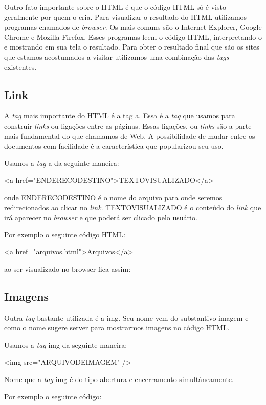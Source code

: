 Outro fato importante sobre o HTML é que o código HTML só é visto geralmente por quem o cria. Para visualizar o resultado do HTML utilizamos programas chamados de \textit{browser}. Os mais comuns são o Internet Explorer, Google Chrome e Mozilla Firefox. Esses programas leem o código HTML, interpretando-o e mostrando em sua tela o resultado. Para obter o resultado final que são os sites que estamos acostumados a visitar utilizamos uma combinação das \textit{tags} existentes.

\subsection{Link}

A \textit{tag} mais importante do HTML é a tag a. Essa é a \textit{tag} que usamos para construir \textit{links} ou ligações entre as páginas. Essas ligações, ou \textit{links} são a parte mais fundamental do que chamamos de Web. A possibilidade de mudar entre os documentos com facilidade é a característica que popularizou seu uso.

Usamos a \textit{tag} a da seguinte maneira:

<a href="ENDERECODESTINO">TEXTOVISUALIZADO</a>

onde ENDERECODESTINO é o nome do arquivo para onde seremos redirecionados ao clicar no \textit{link}. TEXTOVISUALIZADO é o conteúdo do \textit{link} que irá aparecer no \textit{browser} e que poderá ser clicado pelo usuário.

Por exemplo o seguinte código HTML:

<a href="arquivos.html">Arquivos</a>

ao ser visualizado no browser fica assim:


\subsection{Imagens}

Outra \textit{tag} bastante utilizada é a img. Seu nome vem do substantivo imagem e como o nome sugere server para mostrarmos imagens no código HTML.

Usamos a \textit{tag} img da seguinte maneira:

<img src="ARQUIVODEIMAGEM" />

Nome que a \textit{tag} img é do tipo abertura e encerramento simultâneamente.

Por exemplo o seguinte código:

